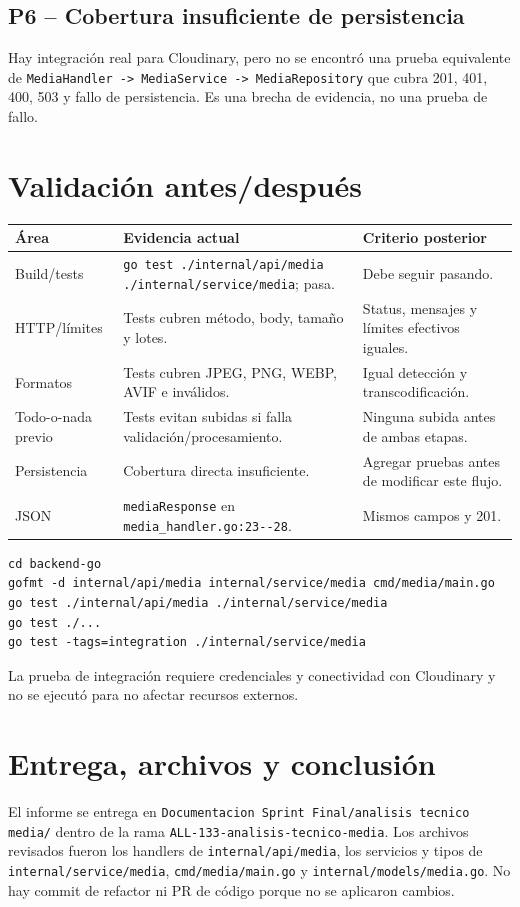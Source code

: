 \documentclass[11pt,a4paper]{article}
\begin{document}
\subsection{P6 -- Cobertura insuficiente de persistencia}
Hay integración real para Cloudinary, pero no se encontró una prueba equivalente de \nolinkurl{MediaHandler -> MediaService -> MediaRepository} que cubra 201, 401, 400, 503 y fallo de persistencia. Es una brecha de evidencia, no una prueba de fallo.

\section{Validación antes/después}
\begin{longtable}{>{\raggedright\arraybackslash}p{}>{\raggedright\arraybackslash}p{}>{\raggedright\arraybackslash}p{}}
\toprule
Área & Evidencia actual & Criterio posterior\\ \midrule
Build/tests & \nolinkurl{go test ./internal/api/media ./internal/service/media}; pasa. & Debe seguir pasando.\\
HTTP/límites & Tests cubren método, body, tamaño y lotes. & Status, mensajes y límites efectivos iguales.\\
Formatos & Tests cubren JPEG, PNG, WEBP, AVIF e inválidos. & Igual detección y transcodificación.\\
Todo-o-nada previo & Tests evitan subidas si falla validación/procesamiento. & Ninguna subida antes de ambas etapas.\\
Persistencia & Cobertura directa insuficiente. & Agregar pruebas antes de modificar este flujo.\\
JSON & \nolinkurl{mediaResponse} en \nolinkurl{media_handler.go:23--28}. & Mismos campos y 201.\\
\bottomrule
\end{longtable}

\begin{lstlisting}
cd backend-go
gofmt -d internal/api/media internal/service/media cmd/media/main.go
go test ./internal/api/media ./internal/service/media
go test ./...
go test -tags=integration ./internal/service/media
\end{lstlisting}
La prueba de integración requiere credenciales y conectividad con Cloudinary y no se ejecutó para no afectar recursos externos.

\section{Entrega, archivos y conclusión}
El informe se entrega en \nolinkurl{Documentacion Sprint Final/analisis tecnico media/} dentro de la rama \nolinkurl{ALL-133-analisis-tecnico-media}. Los archivos revisados fueron los handlers de \nolinkurl{internal/api/media}, los servicios y tipos de \nolinkurl{internal/service/media}, \nolinkurl{cmd/media/main.go} y \nolinkurl{internal/models/media.go}. No hay commit de refactor ni PR de código porque no se aplicaron cambios.
\end{document}
